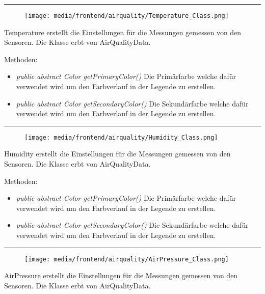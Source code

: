 \rule{\textwidth}{0.4pt} 
\begin{minipage}{0.3\textwidth}
    \begin{figure}[H]
        \texttt{[image: media/frontend/airquality/Temperature\_Class.png]}
    \end{figure}
    \end{minipage} \hfill
    \begin{minipage}{0.6\textwidth}
Temperature erstellt die Einstellungen für die Messungen gemessen von den Sensoren. Die Klasse erbt von AirQualityData.
\end{minipage}

Methoden:
\begin{itemize} 
	\item \emph{public abstract Color getPrimaryColor()} Die Primärfarbe welche dafür verwendet wird um den Farbverlauf in der Legende zu erstellen.
	\item \emph{public abstract Color getSecondaryColor()} Die Sekundärfarbe welche dafür verwendet wird um den Farbverlauf in der Legende zu erstellen.
\end{itemize}

\rule{\textwidth}{0.4pt} 
\begin{minipage}{0.3\textwidth}
    \begin{figure}[H]
        \texttt{[image: media/frontend/airquality/Humidity\_Class.png]}
    \end{figure}
    \end{minipage} \hfill
    \begin{minipage}{0.6\textwidth}
Humidity erstellt die Einstellungen für die Messungen gemessen von den Sensoren. Die Klasse erbt von AirQualityData.
\end{minipage}

Methoden:
\begin{itemize} 
	\item \emph{public abstract Color getPrimaryColor()} Die Primärfarbe welche dafür verwendet wird um den Farbverlauf in der Legende zu erstellen.
	\item \emph{public abstract Color getSecondaryColor()} Die Sekundärfarbe welche dafür verwendet wird um den Farbverlauf in der Legende zu erstellen.
\end{itemize}

\rule{\textwidth}{0.4pt} 
\begin{minipage}{0.3\textwidth}
    \begin{figure}[H]
        \texttt{[image: media/frontend/airquality/AirPressure\_Class.png]}
    \end{figure}
    \end{minipage} \hfill
    \begin{minipage}{0.6\textwidth}
AirPressure erstellt die Einstellungen für die Messungen gemessen von den Sensoren. Die Klasse erbt von AirQualityData.
\end{minipage}

